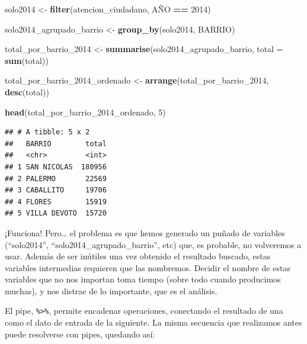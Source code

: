 \documentclass[spanish,]{book}
\newenvironment{Shaded}{\begin{snugshade}}{\end{snugshade}}
\newcommand{\DataTypeTok}[1]{\textcolor[rgb]{0.13,0.29,0.53}{#1}}
\newcommand{\DecValTok}[1]{\textcolor[rgb]{0.00,0.00,0.81}{#1}}
\newcommand{\KeywordTok}[1]{\textcolor[rgb]{0.13,0.29,0.53}{\textbf{#1}}}
\newcommand{\NormalTok}[1]{#1}
\newcommand{\OperatorTok}[1]{\textcolor[rgb]{0.81,0.36,0.00}{\textbf{#1}}}
\newcommand{\StringTok}[1]{\textcolor[rgb]{0.31,0.60,0.02}{#1}}
\begin{document}
\begin{Shaded}
\begin{Highlighting}[]
\NormalTok{solo2014 <-}\StringTok{ }\KeywordTok{filter}\NormalTok{(atencion_ciudadano, AÑO }\OperatorTok{==}\StringTok{ }\DecValTok{2014}\NormalTok{)}

\NormalTok{solo2014_agrupado_barrio <-}\StringTok{ }\KeywordTok{group_by}\NormalTok{(solo2014, BARRIO)}

\NormalTok{total_por_barrio_}\DecValTok{2014}\NormalTok{ <-}\StringTok{ }\KeywordTok{summarise}\NormalTok{(solo2014_agrupado_barrio, }\DataTypeTok{total =} \KeywordTok{sum}\NormalTok{(total))}

\NormalTok{total_por_barrio_}\DecValTok{2014}\NormalTok{_ordenado <-}\StringTok{ }\KeywordTok{arrange}\NormalTok{(total_por_barrio_}\DecValTok{2014}\NormalTok{, }\KeywordTok{desc}\NormalTok{(total))}

\KeywordTok{head}\NormalTok{(total_por_barrio_}\DecValTok{2014}\NormalTok{_ordenado, }\DecValTok{5}\NormalTok{)}
\end{Highlighting}
\end{Shaded}

\begin{verbatim}
## # A tibble: 5 x 2
##   BARRIO        total
##   <chr>         <int>
## 1 SAN NICOLAS  180956
## 2 PALERMO       22569
## 3 CABALLITO     19706
## 4 FLORES        15919
## 5 VILLA DEVOTO  15720
\end{verbatim}

¡Funciona! Pero\ldots{} el problema es que hemos generado un puñado de variables (``solo2014'', ``solo2014\_agrupado\_barrio'', etc) que, es probable, no volveremos a usar. Además de ser inútiles una vez obtenido el resultado buscado, estas variables intermedias requieren que las nombremos. Decidir el nombre de estas variables que no nos importan toma tiempo (sobre todo cuando producimos muchas), y nos distrae de lo importante, que es el análisis.

El pipe, \texttt{\%\textgreater{}\%}, permite encadenar operaciones, conectando el resultado de una como el dato de entrada de la siguiente. La misma secuencia que realizamos antes puede resolverse con pipes, quedando así:

\begin{Shaded}
\end{Shaded}
\end{document}
